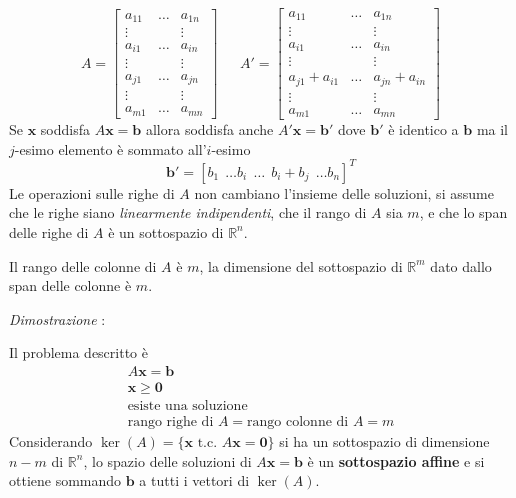\documentclass[10pt, letterpaper]{report}
\begin{document}
\begin{equation}
    A=\begin{bmatrix}
        a_{11}& \dots & a_{1n}\\ 
        \vdots & & \vdots \\ 
        a_{i1}& \dots & a_{in}\\ 
        \vdots & & \vdots \\ 
        a_{j1}& \dots & a_{jn}\\ 
        \vdots & & \vdots \\ 
        a_{m1}& \dots & a_{mn}
    \end{bmatrix} \ \ \ \ \ \ \  A'=\begin{bmatrix}
        a_{11}& \dots & a_{1n}\\ 
        \vdots & & \vdots \\ 
        a_{i1}& \dots & a_{in}\\ 
        \vdots & & \vdots \\ 
        a_{j1}+a_{i1}& \dots & a_{jn}+a_{in}\\ 
        \vdots & & \vdots \\ 
        a_{m1}& \dots & a_{mn}
    \end{bmatrix}
\end{equation}
Se $\mathbf x$ soddisfa $A\mathbf x = \mathbf b$ allora soddisfa anche $A'\mathbf x = \mathbf b'$ dove $\mathbf b'$ è identico a $\mathbf b$ ma il $j$-esimo elemento è sommato all'$i$-esimo $$ \mathbf b' = [b_1 \ \ \dots b_i \ \ \dots \ \ b_i+b_j \ \ \dots b_n]^T$$
Le operazioni sulle righe di $A$ non cambiano l'insieme delle soluzioni, si assume che le righe siano \textit{linearmente indipendenti}, che il rango di $A$ sia $m$, e che lo span delle righe di $A$ è un sottospazio di $\mathbb{R}^n$.\begin{proposizione}
    Il rango delle colonne di $A$ è $m$, la dimensione del sottospazio di $\mathbb R^m$ dato dallo span delle colonne è $m$.
\end{proposizione}
\textit{Dimostrazione} : \bigskip 

Il problema descritto è \begin{eqnarray}
    A\mathbf x = \mathbf b \\ \mathbf x \ge \mathbf  0 \\ \text{esiste una soluzione}\\ 
    \text{rango righe di }A=\text{rango colonne di }A=m
\end{eqnarray}
Considerando $\ker(A)=\{\mathbf x \text{ t.c. }A\mathbf x = \mathbf 0\}$ si ha un sottospazio di dimensione $n-m$ di $\mathbb R^n$, lo spazio delle soluzioni di $A\mathbf x = \mathbf b$ è un \textbf{sottospazio affine} e si ottiene sommando $\mathbf b$ a tutti i vettori di $\ker(A)$.\bigskip 
\end{document}
